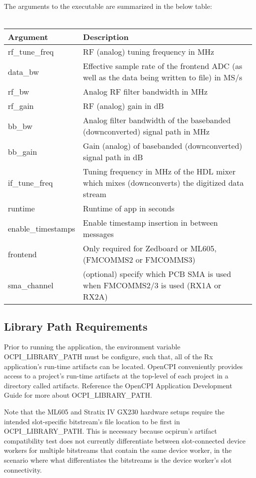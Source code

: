 \noindent The arguments to the executable are summarized in the below table: \\ \\
	\begin{tabular}{|l|l|}
	\hline
	\rowcolor{blue}
	Argument & Description\\
	\hline
	rf\_tune\_freq & RF (analog) tuning frequency in MHz\\
	\hline
	data\_bw & Effective sample rate of the frontend ADC (as well as the data being written to file) in MS/s\\
	\hline
	rf\_bw & Analog RF filter bandwidth in MHz\\
	\hline
	rf\_gain & RF (analog) gain in dB\\
	\hline
	bb\_bw & Analog filter bandwidth of the basebanded (downconverted) signal path in MHz\\
	\hline
	bb\_gain & Gain (analog) of basebanded (downconverted) signal path in dB\\
	\hline
	if\_tune\_freq & Tuning frequency in MHz of the HDL mixer which mixes (downconverts) the digitized data stream\\
	\hline
	runtime & Runtime of app in seconds\\
	\hline
	enable\_timestamps & Enable timestamp insertion in between messages\\
	\hline
	frontend     & Only required for Zedboard or ML605, (FMCOMMS2 or FMCOMMS3) \\
	\hline
	sma\_channel & (optional) specify which PCB SMA is used when FMCOMMS2/3 is used (RX1A or RX2A) \\
	\hline
	\end{tabular} \medskip

\subsection{Library Path Requirements}
\noindent Prior to running the application, the environment variable OCPI\_LIBRARY\_PATH must be configure, such that, all of the Rx application's run-time artifacts can be located. OpenCPI conveniently provides access to a project's run-time artifacts at the top-level of each project in a directory called artifacts. Reference the OpenCPI Application Development Guide for more about OCPI\_LIBRARY\_PATH. \par\medskip
\noindent Note that the ML605 and Stratix IV GX230 hardware setups require the intended slot-specific bitstream's file location to be first in OCPI\_LIBRARY\_PATH. This is necessary because ocpirun's artifact compatibility test does not currently differentiate between slot-connected device workers for multiple bitstreams that contain the same device worker, in the scenario where what differentiates the bitstreams is the device worker's slot connectivity. \par\medskip

